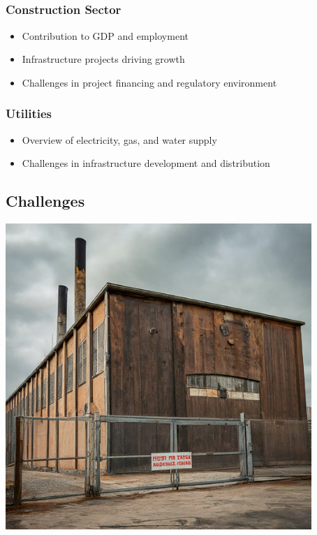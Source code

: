 \documentclass[
  letterpaper,
  DIV=11,
  numbers=noendperiod]{scrartcl}
\providecommand{\tightlist}{%
  \setlength{\itemsep}{0pt}\setlength{\parskip}{0pt}}\usepackage{longtable,booktabs,array}
\begin{document}
\subsection{}\label{section}

\subsubsection{Construction Sector}\label{construction-sector}

\begin{itemize}
\tightlist
\item
  Contribution to GDP and employment
\item
  Infrastructure projects driving growth
\item
  Challenges in project financing and regulatory environment
\end{itemize}

\subsubsection{Utilities}\label{utilities}

\begin{itemize}
\tightlist
\item
  Overview of electricity, gas, and water supply
\item
  Challenges in infrastructure development and distribution
\end{itemize}

\subsection{Challenges}\label{challenges}

\includegraphics[width=4.5625in,height=\textheight]{images/industrial2.jpeg}
\end{document}
